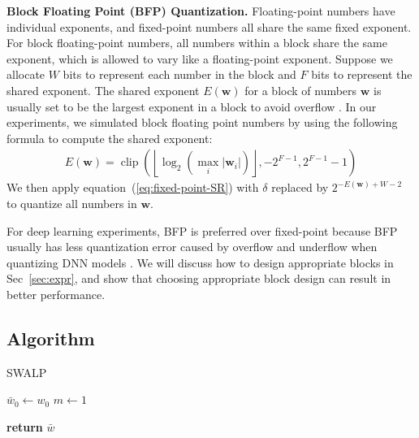 \documentclass{article}
\begin{document}
\textbf{Block Floating Point (BFP) Quantization.}
Floating-point numbers have individual exponents, and fixed-point numbers all share the same fixed exponent.
For block floating-point numbers, all numbers within a block share the same exponent, which is allowed to vary like a floating-point exponent.
Suppose we allocate $W$ bits to represent each number in the block and $F$ bits to represent the shared exponent.
The shared exponent $E(\mathbf{w})$ for a block of numbers $\mathbf{w}$ is usually set to be the largest exponent in a block to avoid overflow \cite{error-analysis,Mixed-precision-training}. 
In our experiments, we simulated block floating point numbers by using the following formula to compute the shared exponent:
\begin{align*}
{\textstyle
E(\mathbf{w}) = \operatorname{clip}(\left \lfloor \log_2(\max_i|\mathbf{w}_i|)\right \rfloor, -2^{F-1}, 2^{F-1}-1)    
}
\end{align*}
We then apply equation~(\ref{eq:fixed-point-SR}) with $\delta$ replaced by $2^{-E(\mathbf{w}) + W - 2}$ to quantize all numbers in $\mathbf{w}$.

For deep learning experiments, BFP is preferred over fixed-point because BFP usually has less quantization error caused by overflow and underflow when quantizing DNN models \cite{error-analysis}.
We will discuss how to design appropriate blocks in Sec~\ref{sec:expr}, and show that choosing appropriate block design can result in better performance.

\subsection{Algorithm}\label{sec:method-algo}

\begin{algorithm}[t]
  \caption{SWALP}
  \label{alg:SWALP}
\begin{algorithmic}
\STATE $\bar{w}_0 \leftarrow w_0$ 
\STATE $m \leftarrow 1$ 

         
    \ENDIF\ENDFOR
\STATE \textbf{return} $\bar{w}$
\end{algorithmic}
\end{algorithm}
\end{document}
